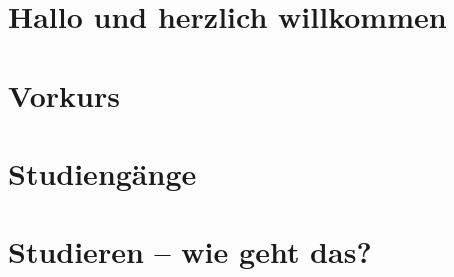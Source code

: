 \documentclass[ngerman,a4paper,openany,showtrims]{memoir}
\begin{document}
\pagestyle{empty}

\frontmatter

\tableofcontents

\mainmatter
\pagestyle{plain}

\chapter{Hallo und herzlich willkommen}


\chapter{Vorkurs}





\chapter{Studiengänge}










\chapter{Studieren -- wie geht das?}
















\end{document}
